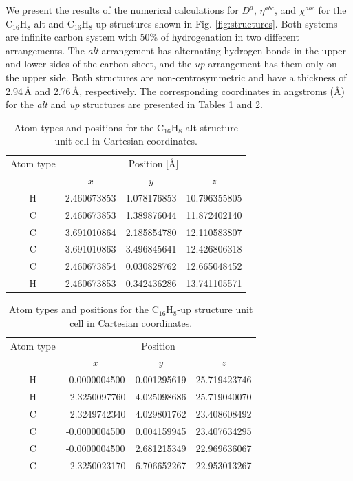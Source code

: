 \documentclass[pss]{wiley2sp} %
\begin{document}
We present the results of the numerical calculations for {$D^{a}$}, {$\eta^{abc}$}, and $\chi^{abc}$ for the C$_{16}$H$_{8}$-alt and C$_{16}$H$_{8}$-up structures shown in Fig. \ref{fig:structures}. Both systems are infinite carbon system with 50\% of hydrogenation in two different arrangements. The \emph{alt} arrangement has alternating hydrogen bonds in the upper and lower sides of the carbon sheet, and the \emph{up} arrangement has them only on the upper side. Both structures are non-centrosymmetric and have a thickness of 2.94\,{\AA} and 2.76\,{\AA}, respectively. The corresponding coordinates in angstroms (\AA) for the \emph{alt} and \emph{up} structures are presented in Tables \ref{tab:altstrc} and \ref{tab:upstrc}.
\begin{table}[t]
  \begin{tabular}{cccc}
  \hline
  Atom type &  \multicolumn{3}{c}{Position [\AA] } \\
  \cline{2-4}
  & $x$ & $y$ & $z$ \\
  \hline
H & 2.460673853 & 1.078176853 & 10.796355805 \\
C & 2.460673853 & 1.389876044 & 11.872402140 \\
C & 3.691010864 & 2.185854780 & 12.110583807 \\
C & 3.691010863 & 3.496845641 & 12.426806318 \\
C & 2.460673854 & 0.030828762 & 12.665048452 \\
H & 2.460673853 & 0.342436286 & 13.741105571 \\
  \hline
  \end{tabular}
  \caption[]{%
  Atom types and positions for the C$_{16}$H$_{8}$-alt structure unit cell in Cartesian coordinates.}
  \label{tab:altstrc}
\end{table}
\begin{table}[t]
  \begin{tabular}{cccc}
  \hline
  Atom type &  \multicolumn{3}{c}{Position} \\
  \cline{2-4}
  & $x$ & $y$ & $z$ \\
  \hline
H &  -0.0000004500 & 0.001295619 & 25.719423746 \\
H & \ 2.3250097760 & 4.025098686 & 25.719040070 \\
C & \ 2.3249742340 & 4.029801762 & 23.408608492 \\
C &  -0.0000004500 & 0.004159945 & 23.407634295 \\
C &  -0.0000004500 & 2.681215349 & 22.969636067 \\
C & \ 2.3250023170 & 6.706652267 & 22.953013267 \\
  \hline
  \end{tabular}
  \caption[]{%
  Atom types and positions for the C$_{16}$H$_{8}$-up structure unit cell in Cartesian coordinates.}
  \label{tab:upstrc}
\end{table}
\end{document}
